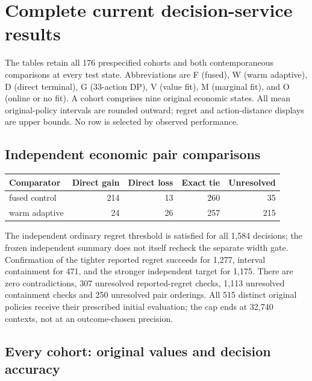\section{Complete current decision-service results}\label{dev:service126}

The tables retain all 176 prespecified cohorts and both contemporaneous comparisons at every test state. Abbreviations are F (fused), W (warm adaptive), D (direct terminal), G (33-action DP), V (value fit), M (marginal fit), and O (online or no fit). A cohort comprises nine original economic states. All mean original-policy intervals are rounded outward; regret and action-distance displays are upper bounds. No row is selected by observed performance.

\subsection{Independent economic pair comparisons}

\begin{center}\begin{tabular}{lrrrr}\toprule

Comparator & Direct gain & Direct loss & Exact tie & Unresolved\\\midrule

fused control & 214 & 13 & 260 & 35 \\

warm adaptive & 24 & 26 & 257 & 215 \\

\bottomrule\end{tabular}\end{center}

The independent ordinary regret threshold is satisfied for all 1,584 decisions; the frozen independent summary does not itself recheck the separate width gate. Confirmation of the tighter reported regret succeeds for 1,277, interval containment for 471, and the stronger independent target for 1,175. There are zero contradictions, 307 unresolved reported-regret checks, 1,113 unresolved containment checks and 250 unresolved pair orderings. All 515 distinct original policies receive their prescribed initial evaluation; the cap ends at 32,740 contexts, not at an outcome-chosen precision.

\subsection{Every cohort: original values and decision accuracy}

